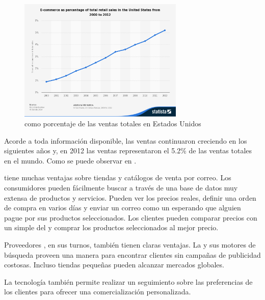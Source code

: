 \begin{figure}[h!]
	\centering
	\includegraphics[width=0.7\textwidth]{figuras/ecommerce_percent.jpg}
	\caption{\ecommerce como porcentaje de las ventas totales en Estados Unidos}
	\label{figure:ecommerce_percent_sales}
\end{figure}

Acorde a toda información disponible, las ventas \ecommerce continuaron creciendo en los siguientes años y, en 2012 las ventas \ecommerce representaron el 5.2\% de las ventas totales en el mundo. Como se puede observar en .

\ecommerce tiene muchas ventajas sobre tiendas \brickandmortar y catálogos de venta por correo. Los consumidores pueden fácilmente buscar a través de una base de datos muy extensa de productos y servicios. Pueden ver los precios reales, definir una orden de compra en varios días y enviar un correo como un \wishlist esperando que alguien pague por sus productos seleccionados. Los clientes pueden comparar precios con un simple \click del \mouse y comprar los productos seleccionados al mejor precio.

Proveedores \online, en sus turnos, también tienen claras ventajas. La \web y sus motores de búsqueda proveen una manera para encontrar clientes sin campañas de publicidad costosas. Incluso tiendas \online pequeñas pueden alcanzar mercados globales. 

La tecnología \web también permite realizar un seguimiento sobre las preferencias de los clientes para ofrecer una comercialización personalizada.

